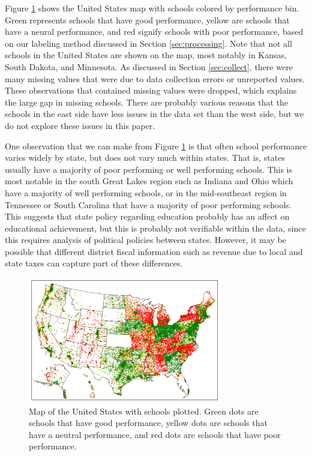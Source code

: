 Figure \ref{fig:us} shows the United States map with schools colored by performance bin. Green represents schools that have good performance, yellow are schools that have a neural performance, and red signify schools with poor performance, based on our labeling method discussed in Section \ref{sec:processing}. Note that not all schools in the United States are shown on the map, most notably in Kansas, South Dakota, and Minnesota. As discussed in Section \ref{sec:collect}, there were many missing values that were due to data collection errors or unreported values. These observations that contained missing values were dropped, which explains the large gap in missing schools. There are probably various reasons that the schools in the east side have less issues in the data set than the west side, but we do not explore these issues in this paper.

One observation that we can make from Figure \ref{fig:us} is that often school performance varies widely by state, but does not vary much within states. That is, states usually have a majority of poor performing or well performing schools. This is most notable in the south Great Lakes region such as Indiana and Ohio which have a majority of well performing schools, or in the mid-southeast region in Tennessee or South Carolina that have a majority of poor performing schools. This suggests that state policy regarding education probably has an affect on educational achievement, but this is probably not verifiable within the data, since this requires analysis of political policies between states. However, it may be possible that different district fiscal information such as revenue due to local and state taxes can capture part of these differences.

\begin{figure} 
	\includegraphics[width=8.45cm]{images/avg_us.png}
	\caption{Map of the United States with schools plotted. Green dots are schools that have good performance, yellow dots are schools that have a neutral performance, and red dots are schools that have poor performance.}
	\label{fig:us}
\end{figure}

